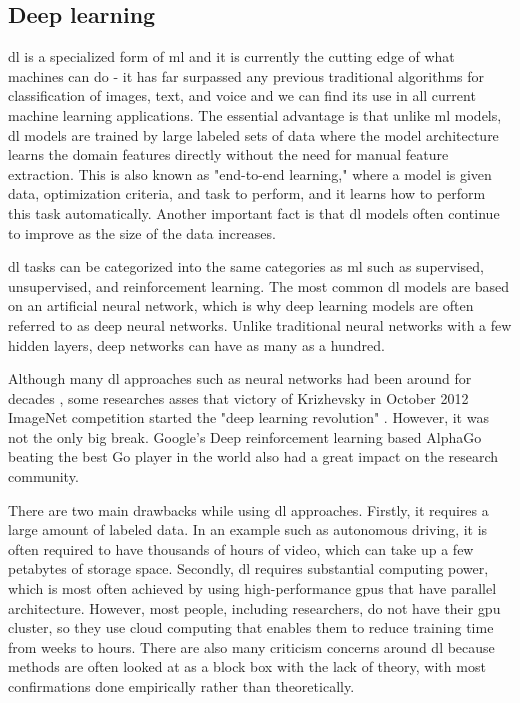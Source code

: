     \subsection{Deep learning}
        \Gls{dl} is a specialized form of \gls{ml} and it is currently the cutting edge of what machines can do - it has far surpassed any previous traditional algorithms for classification of images, text, and voice and we can find its use in all current machine learning applications. The essential advantage is that unlike \gls{ml} models, \Gls{dl} models are trained by large labeled sets of data where the model architecture learns the domain features directly without the need for manual feature extraction. This is also known as "end-to-end learning," where a model is given data, optimization criteria, and task to perform, and it learns how to perform this task automatically. Another important fact is that \gls{dl} models often continue to improve as the size of the data increases.
        
        \Gls{dl} tasks can be categorized into the same categories as \gls{ml} such as supervised, unsupervised, and reinforcement learning. The most common \gls{dl} models are based on an artificial neural network, which is why deep learning models are often referred to as deep neural networks. Unlike traditional neural networks with a few hidden layers, deep networks can have as many as a hundred. 
        
        Although many \gls{dl} approaches such as neural networks had been around for decades \cite{fukushima1980neocognitron, lecun1989backpropagation, lecun1998gradient}, some researches asses that victory of Krizhevsky in October 2012 ImageNet competition started the "deep learning revolution" \cite{russakovsky2015imagenet}. However, it was not the only big break. Google’s Deep reinforcement learning based AlphaGo beating the best Go player in the world \cite{kochgo} also had a great impact on the research community. 
        
        There are two main drawbacks while using \gls{dl} approaches. Firstly, it requires a large amount of labeled data. In an example such as autonomous driving, it is often required to have thousands of hours of video, which can take up a few petabytes of storage space. Secondly, \gls{dl} requires substantial computing power, which is most often achieved by using high-performance \gls{gpu}s that have parallel architecture. However, most people, including researchers, do not have their \gls{gpu} cluster, so they use cloud computing that enables them to reduce training time from weeks to hours. There are also many criticism concerns around \gls{dl} because methods are often looked at as a block box with the lack of theory, with most confirmations done empirically rather than theoretically.
        
